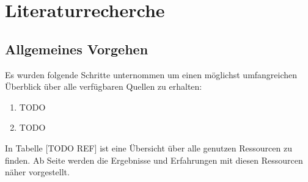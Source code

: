 \section{Literaturrecherche}

\subsection{Allgemeines Vorgehen}

Es wurden folgende Schritte unternommen um einen möglichst umfangreichen Überblick über alle verfügbaren Quellen zu erhalten:
\begin{enumerate}
\item TODO
\item TODO
\end{enumerate}
In Tabelle [TODO REF] ist eine Übersicht über alle genutzen Ressourcen zu finden. Ab Seite \pageref{startdetails} werden die Ergebnisse und Erfahrungen mit diesen Ressourcen näher vorgestellt.

